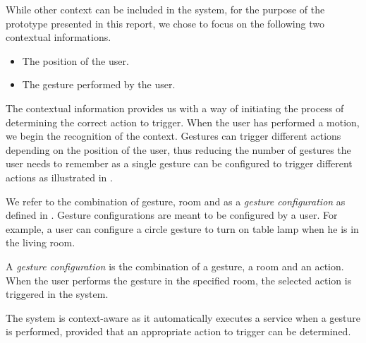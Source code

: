 While other context can be included in the system, for the purpose of the prototype presented in this report, we chose to focus on the following two contextual informations.

\begin{itemize}
\item The position of the user.
\item The gesture performed by the user.
\end{itemize}

The contextual information provides us with a way of initiating the process of determining the correct action to trigger. When the user has performed a motion, we begin the recognition of the context. Gestures can trigger different actions depending on the position of the user, thus reducing the number of gestures the user needs to remember as a single gesture can be configured to trigger different actions as illustrated in .

We refer to the combination of gesture, room and as a \emph{gesture configuration} as defined in . Gesture configurations are meant to be configured by a user. For example, a user can configure a circle gesture to turn on table lamp when he is in the living room.

\begin{definition}
\label{def:gesture-configuration}
A \emph{gesture configuration} is the combination of a gesture, a room and an action. When the user performs the gesture in the specified room, the selected action is triggered in the system.
\end{definition}

The system is context-aware as it automatically executes a service when a gesture is performed, provided that an appropriate action to trigger can be determined.

